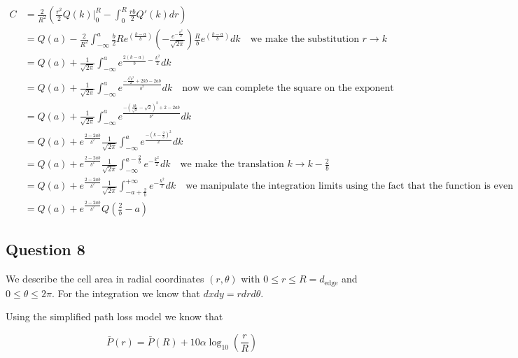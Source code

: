\documentclass[]{article}
\begin{document}
	\begin{align}
		C &= \frac{2}{R^2}\left(\frac{r^2}{2}Q(k)\big|_0^R - \int_{0}^{R} \frac{rb}{2} Q'(k) dr \right) \\
		&= Q(a) - \frac{2}{R^2} \int_{-\infty}^{a} \frac{b}{2}R e^{\left(\frac{k-a}{b}\right)} \left(-\frac{e^{-\frac{k^2}{2}}}{\sqrt{2\pi}}\right)\frac{R}{b}e^{\left(\frac{k-a}{b}\right)}dk \quad \text{we make the substitution $r \to k$} \\
		&= Q(a) + \frac{1}{\sqrt{2\pi}}\int_{-\infty}^{a} e^{\frac{2(k-a)}{b} - \frac{k^2}{2}} dk \\
		&= Q(a) + \frac{1}{\sqrt{2\pi}}\int_{-\infty}^{a} e^{\frac{-\frac{b^2k^2}{2} + 2kb - 2ab}{b^2}} dk \quad \text{now we can complete the square on the exponent} \\
		&= Q(a) + \frac{1}{\sqrt{2\pi}}\int_{-\infty}^{a} e^{\frac{-\left(\frac{bk}{\sqrt{2}} - \sqrt{2}\right)^2 + 2 -2ab}{b^2}} dk \\
		&= Q(a) + e^{\frac{2 - 2ab}{b^2}}\frac{1}{\sqrt{2\pi}}\int_{-\infty}^{a} e^{\frac{-\left(k - \frac{2}{b}\right)^2}{2}} dk \\
		&= Q(a) + e^{\frac{2 - 2ab}{b^2}}\frac{1}{\sqrt{2\pi}}\int_{-\infty}^{a-\frac{2}{b}} e^{-\frac{k^2}{2}} dk \quad \text{we make the translation $k \to k - \frac{2}{b} $} \\
		&= Q(a) + e^{\frac{2 - 2ab}{b^2}}\frac{1}{\sqrt{2\pi}}\int_{-a+\frac{2}{b}}^{+\infty} e^{-\frac{k^2}{2}} dk \quad \text{we manipulate the integration limits using the fact that the function is even}\\
		&= Q(a) + e^{\frac{2 - 2ab}{b^2}}Q\left(\frac{2}{b} - a\right)
	\end{align}
	
	\subsection*{Question 8}
	
	We describe the cell area in radial coordinates $(r, \theta)$ with $0\leq r\leq R = d_{\mathrm{edge}}$ and $0 \leq \theta \leq 2\pi$. For the integration we know that $dx dy = r dr d\theta$.
	
	Using the simplified path loss model we know that
	
	\begin{equation}
		\bar{P}(r) = \bar{P}(R) + 10\alpha \log_{10}\left(\frac{r}{R}\right)
	\end{equation}
	
\end{document}
